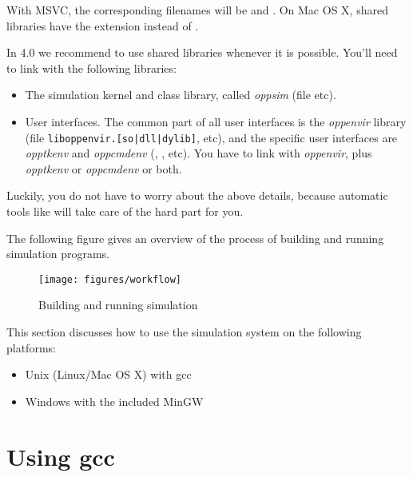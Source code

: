 \begin{note}
With MSVC, the corresponding filenames will be  and .
On Mac OS X, shared libraries have the  extension instead of .
\end{note}

In {\opp} 4.0 we recommend to use shared libraries whenever it is possible.
You'll need to link with the following libraries:

\begin{itemize}
  \item{The simulation kernel and class library,
    called \textit{oppsim} (file  etc).}
  \item{User interfaces. The common part of all user interfaces is
    the \textit{oppenvir} library (file \texttt{liboppenvir.[so|dll|dylib]}, etc),
    and the specific user interfaces are \textit{opptkenv} and \textit{oppcmdenv}
    (, , etc).
    You have to link with \textit{oppenvir}, plus \textit{opptkenv} or
    \textit{oppcmdenv} or both.}
\end{itemize}

Luckily, you do not have to worry about the above details, because
automatic tools like  will take care of the hard
part for you.

The following figure gives an overview of the process of building
and running simulation programs.

\begin{figure}[htbp]
  \begin{center}
    \texttt{[image: figures/workflow]}
    \caption{Building and running simulation}
  \end{center}
\end{figure}


This section discusses how to use the simulation system on the
following platforms:
\begin{itemize}
  \item{Unix (Linux/Mac OS X) with gcc}
  \item{Windows with the included MinGW}
\end{itemize}


\section{Using gcc}


